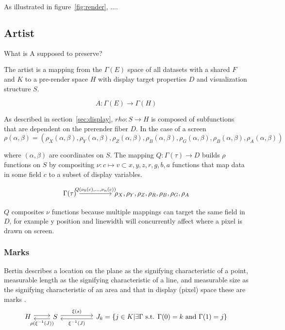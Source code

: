 \documentclass[../main.tex]{subfiles}
\begin{document}
As illustrated in figure~\ref{fig:render}, ....


\subsection{Artist}
What is A supposed to preserve?

The artist is a mapping from the $\Gamma(E)$ space of all datasets with a shared $F$ and $K$ to a pre-render space $H$ with display target properties $D$ and visualization structure $S$. 

\begin{equation}
    A: \Gamma(E) \rightarrow \Gamma(H)
\end{equation}

As described in section~\ref{sec:display}, $rho: S \rightarrow H$ is composed of subfunctions that are dependent on the prerender fiber $D$. In the case of a screen
\begin{equation}
    \rho (\alpha, \beta) = (\rho_X(\alpha, \beta), \rho_Y(\alpha, \beta), \rho_Z(\alpha, \beta), \rho_B(\alpha, \beta), \rho_G(\alpha, \beta), \rho_B(\alpha, \beta), \rho_A(\alpha, \beta))
\end{equation}

where $(\alpha, \beta)$ are coordinates on $S$. The mapping $Q: \Gamma(\tau) \rightarrow D$ builds $\rho$ functions on $S$ by compositing $\nu: c \mapsto v \subset {x,y,z,r,g,b,a}$ functions that map data in some field $c$ to a subset of display variables. 

\begin{equation}
    \begin{tikzcd}
        \Gamma(\tau) \arrow[rr, "{Q(\nu_{0}(c),\ldots,\nu_n(c))}"] &  & {\rho_X, \rho_Y, \rho_Z, \rho_R, \rho_B, \rho_G, \rho_A}
    \end{tikzcd}
    \label{eq:Q}
\end{equation}

$Q$ composites $\nu$ functions because multiple mappings can target the same field in $D$, for example y position and linewidth will concurrently affect where a pixel is drawn on screen. 

\subsubsection{Marks}
Bertin describes a location on the plane as the signifying characteristic of a point, measurable length as the signifying characteristic of a line, and measurable size as the signifying characteristic of an area and that in display (pixel) space these are marks \cite{bertinIIPropertiesGraphic2011,carpendaleVisualRepresentationSemiology}. 
\begin{equation}
\begin{tikzcd}
    H \arrow[r, shift left] & S \arrow[l, "\rho(\xi^{-1}(J))", shift left] \arrow[rr, "\xi(s)", shift left] &  & J_{k} =  \{j \in K| \exists \Gamma \text{ s.t. } \Gamma(0)=k \text{ and }\Gamma(1)=j\} \arrow[ll, "\xi^{-1}(J)", shift left]
\end{tikzcd}
\label{eq:mark}
\end{equation}
\end{document}
